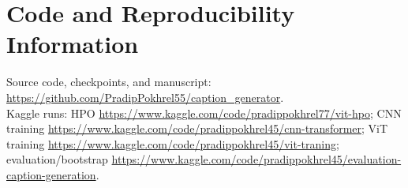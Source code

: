 \documentclass[conference]{IEEEtran}
\begin{document}
\appendices
\section{Code and Reproducibility Information}

\begingroup\footnotesize
Source code, checkpoints, and manuscript: \url{https://github.com/PradipPokhrel55/caption_generator}.\\
Kaggle runs: HPO \url{https://www.kaggle.com/code/pradippokhrel77/vit-hpo}; CNN training \url{https://www.kaggle.com/code/pradippokhrel45/cnn-transformer}; ViT training \url{https://www.kaggle.com/code/pradippokhrel45/vit-traning}; evaluation/bootstrap \url{https://www.kaggle.com/code/pradippokhrel45/evaluation-caption-generation}.
\endgroup
\end{document}
